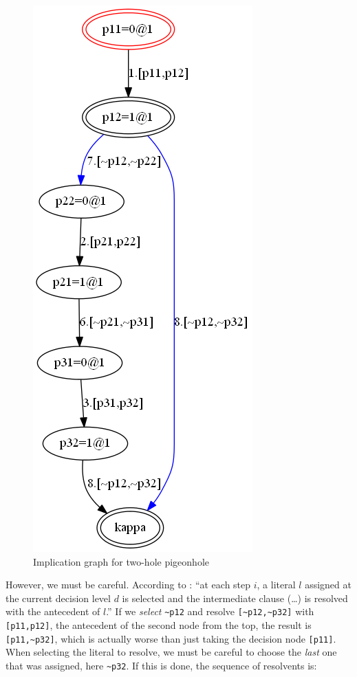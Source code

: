 \documentclass[11pt]{report}
\begin{document}
\begin{figure}
\begin{center}
\includegraphics[keepaspectratio=true,height=.9\textheight]{pigeon2-color}
\end{center}
\caption{Implication graph for two-hole pigeonhole}\label{pigeon2}
\end{figure}

However, we must be careful. According to \cite[p.~137]{mlm}: ``at each
step $i$, a literal $l$ assigned at the current decision level $d$ is
selected and the intermediate clause (\ldots) is resolved with the
antecedent of $l$.'' If we \emph{select} \verb+~p12+ and resolve \verb+[~p12,~p32]+ with \verb+[p11,p12]+, the antecedent of the second node from the top, the result is \verb+[p11,~p32]+, which is actually worse than just taking
the decision node \verb+[p11]+. When selecting the literal to resolve,
we must be careful to choose the \emph{last} one that was assigned, here
\verb+~p32+. If this is done, the sequence of resolvents is:
\end{document}
